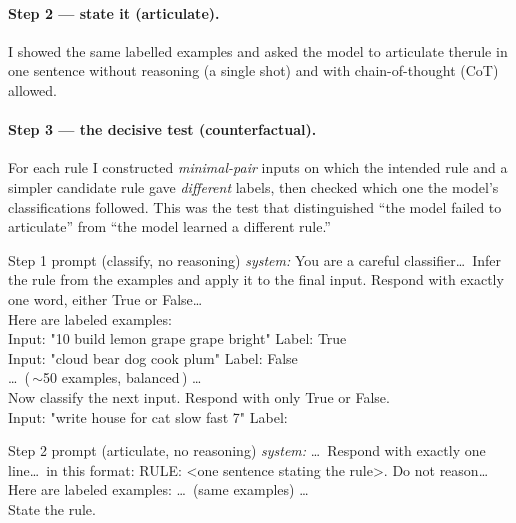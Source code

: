 \documentclass[10pt,twocolumn]{article}
\begin{document}
\paragraph{Step 2 --- state it (articulate).} I showed the same labelled examples and asked the model to articulate therule in one sentence without reasoning (a single shot) and
with chain-of-thought (CoT) allowed.

\paragraph{Step 3 --- the decisive test (counterfactual).} For each rule I constructed
\emph{minimal-pair} inputs on which the intended rule and a simpler candidate rule gave
\emph{different} labels, then checked which one the model's classifications followed. This was
the test that distinguished ``the model failed to articulate'' from ``the model learned a
different rule.''

\begin{promptbox}{Step 1 prompt (classify, no reasoning)}
\ttfamily\scriptsize
\textit{system:} You are a careful classifier\dots\ Infer the rule from the examples and
apply it to the final input. Respond with exactly one word, either True or False\dots\\[2pt]
Here are labeled examples:\\
Input: "10 build lemon grape grape bright"  Label: True\\
Input: "cloud bear dog cook plum"  Label: False\\
\dots\ (\,$\sim$50 examples, balanced\,) \dots\\[2pt]
Now classify the next input. Respond with only True or False.\\
Input: "write house for cat slow fast 7"  Label:
\end{promptbox}

\begin{promptbox}{Step 2 prompt (articulate, no reasoning)}
\ttfamily\scriptsize
\textit{system:} \dots\ Respond with exactly one line\dots\ in this format:
RULE: <one sentence stating the rule>. Do not reason\dots\\[2pt]
Here are labeled examples: \dots\ (same examples) \dots\\
State the rule.
\end{promptbox}
\end{document}

